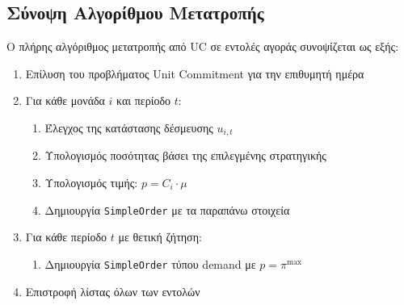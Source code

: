 \subsection{Σύνοψη Αλγορίθμου Μετατροπής}
\label{subsec:conversion-algorithm}

Ο πλήρης αλγόριθμος μετατροπής από UC σε εντολές αγοράς συνοψίζεται ως εξής:

\begin{enumerate}
    \item Επίλυση του προβλήματος Unit Commitment για την επιθυμητή ημέρα
    \item Για κάθε μονάδα $i$ και περίοδο $t$:
    \begin{enumerate}
        \item Έλεγχος της κατάστασης δέσμευσης $u_{i,t}$
        \item Υπολογισμός ποσότητας βάσει της επιλεγμένης στρατηγικής
        \item Υπολογισμός τιμής: $p = C_i \cdot \mu$
        \item Δημιουργία \texttt{SimpleOrder} με τα παραπάνω στοιχεία
    \end{enumerate}
    \item Για κάθε περίοδο $t$ με θετική ζήτηση:
    \begin{enumerate}
        \item Δημιουργία \texttt{SimpleOrder} τύπου demand με $p = \pi^{\max}$
    \end{enumerate}
    \item Επιστροφή λίστας όλων των εντολών
\end{enumerate}
